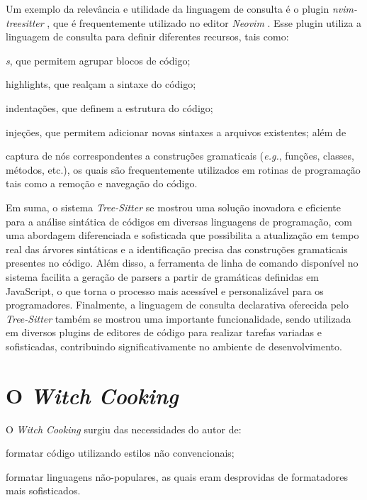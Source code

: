 \documentclass[11pt, a4paper, english, openright, twoside, brazil]{abntex2}
\begin{document}
  Um exemplo da relevância e utilidade da linguagem de consulta é o plugin
  \textit{nvim-treesitter} \cite{nvim-treesitter-2023-nvim}, que é
  frequentemente utilizado no editor \textit{Neovim}
  \cite{neovim-2014-hyperextensible}. Esse plugin utiliza a linguagem de
  consulta para definir diferentes recursos, tais como:
  \begin{inparaenum}
    \item \textit{s}, que permitem agrupar blocos de código;
    \item highlights, que realçam a sintaxe do código;
    \item indentações, que definem a estrutura do código;
    \item injeções, que permitem adicionar novas sintaxes a arquivos
          existentes; além de
    \item captura de nós correspondentes a construções gramaticais
          (\textit{e.g.}, funções, classes, métodos, etc.), os quais são
          frequentemente utilizados em rotinas de programação tais como a
          remoção e navegação do código.
  \end{inparaenum}

  Em suma, o sistema \textit{Tree-Sitter} se mostrou uma solução inovadora e
  eficiente para a análise sintática de códigos em diversas linguagens de
  programação, com uma abordagem diferenciada e sofisticada que possibilita a
  atualização em tempo real das árvores sintáticas e a identificação precisa
  das construções gramaticais presentes no código. Além disso, a ferramenta de
  linha de comando disponível no sistema facilita a geração de parsers a partir
  de gramáticas definidas em JavaScript, o que torna o processo mais acessível
  e personalizável para os programadores. Finalmente, a linguagem de consulta
  declarativa oferecida pelo \textit{Tree-Sitter} também se mostrou uma
  importante funcionalidade, sendo utilizada em diversos plugins de editores de
  código para realizar tarefas variadas e sofisticadas, contribuindo
  significativamente no ambiente de desenvolvimento.


  \chapter{O \textit{Witch Cooking}}

  O \textit{Witch Cooking} surgiu das necessidades do autor de:
  \begin{inparaenum}
    \item formatar código utilizando estilos não convencionais;
    \item formatar linguagens não-populares, as quais eram desprovidas de
          formatadores mais sofisticados.
  \end{inparaenum}


  \postextual
  \printbibliography
\end{document}
